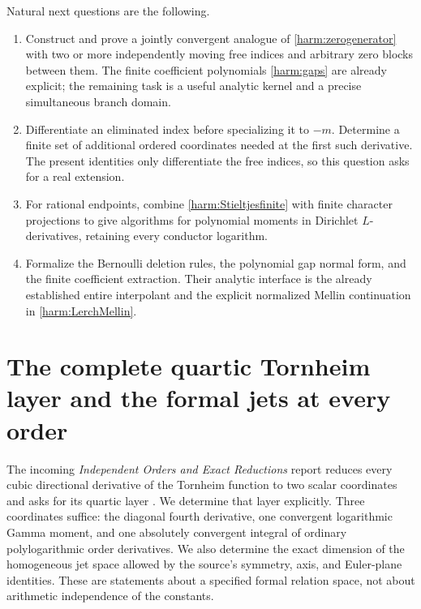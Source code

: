 \documentclass[11pt,a4paper]{article}
\numberwithin{equation}{section}
\theoremstyle{definition}
\theoremstyle{remark}
\begin{document}
Natural next questions are the following.
\begin{enumerate}
\item Construct and prove a jointly convergent analogue of
\eqref{harm:zerogenerator} with two or more independently moving free
indices and arbitrary zero blocks between them. The finite coefficient
polynomials \eqref{harm:gaps} are already explicit; the remaining task
is a useful analytic kernel and a precise simultaneous branch domain.
\item Differentiate an eliminated index before specializing it to
$-m$. Determine a finite set of additional ordered coordinates needed
at the first such derivative. The present identities only differentiate
the free indices, so this question asks for a real extension.
\item For rational endpoints, combine \eqref{harm:Stieltjesfinite}
with finite character projections to give algorithms for polynomial
moments in Dirichlet $L$-derivatives, retaining every conductor logarithm.
\item Formalize the Bernoulli deletion rules, the polynomial gap
normal form, and the finite coefficient extraction. Their analytic
interface is the already established entire interpolant and the
explicit normalized Mellin continuation in \eqref{harm:LerchMellin}.
\end{enumerate}



\section{The complete quartic Tornheim layer and the formal jets at every order}
\label{qtr:section}

The incoming \emph{Independent Orders and Exact Reductions} report
reduces every cubic directional derivative of the Tornheim function to
two scalar coordinates and asks for its quartic layer
\cite{qtr:Independent}. We determine that layer explicitly. Three
coordinates suffice: the diagonal fourth derivative, one convergent
logarithmic Gamma moment, and one absolutely convergent integral of
ordinary polylogarithmic order derivatives. We also determine the exact
dimension of the homogeneous jet space allowed by the source's symmetry,
axis, and Euler-plane identities. These are statements about a
specified formal relation space, not about arithmetic independence of
the constants.
\end{document}
